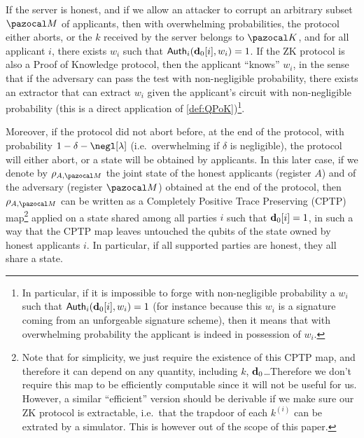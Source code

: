 \begin{lemmaE}\label{lem:correctnessCanDist}
  If the server is honest, and if we allow an attacker to corrupt an arbitrary subset $\cM$ of applicants, then with overwhelming probabilities, the protocol either aborts, or the $k$ received by the server belongs to $\cK$, and for all applicant $i$, there exists $w_i$ such that ${\sf Auth}_i(\mathbf{d}_0[i],w_i) = 1$. If the ZK protocol is also a Proof of Knowledge protocol, then the applicant ``knows'' $w_i$, in the sense that if the adversary can pass the test with non-negligible probability, there exists an extractor that can extract $w_i$ given the applicant's circuit with non-negligible probability (this is a direct application of \cref{def:QPoK})\footnote{In particular, if it is impossible to forge with non-negligible probability a $w_i$ such that ${\sf Auth}_i(\mathbf{d}_0[i],w_i)=1$ (for instance because this $w_i$ is a signature coming from an unforgeable signature scheme), then it means that with overwhelming probability the applicant is indeed in possession of $w_i$.}.

  Moreover, if the protocol did not abort before, at the end of the protocol, with probability $1-\delta-\negl[\lambda]$ (i.e.\ overwhelming if $\delta$ is negligible), the protocol will either abort, or a state will be obtained by applicants. In this later case, if we denote by $\rho_{A,\cM}$ the joint state of the honest applicants (register $A$) and of the adversary (register $\cM$) obtained at the end of the protocol, then $\rho_{A,\cM}$ can be written as a Completely Positive Trace Preserving (CPTP) map\footnote{\label{note:prooflemma57}Note that for simplicity, we just require the existence of this CPTP map, and therefore it can depend on any quantity, including $k$, $\mathbf{d}_0$\dots Therefore we don't require this map to be efficiently computable since it will not be useful for us. However, a similar ``efficient'' version should be derivable if we make sure our ZK protocol is extractable, i.e.\ that the trapdoor of each $k^{(i)}$ can be extrated by a simulator. This is however out of the scope of this paper.} applied on a \GHZ{} state shared among all parties $i$ such that $\mathbf{d}_0[i]=1$, in such a way that the CPTP map leaves untouched the qubits of the \GHZ{} state owned by honest applicants $i$. In particular, if all supported parties are honest, they all share a \GHZ{} state.
\end{lemmaE}
